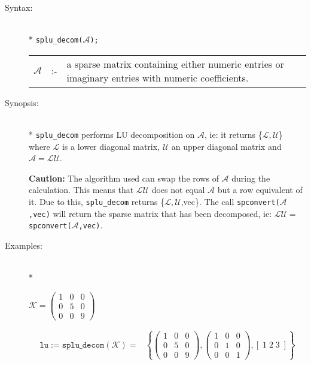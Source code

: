 \begin{description}
\item[Syntax:]\mbox{}\\*
\texttt{splu\_decom($\mathcal{A}$);}\\[2mm]
\begin{tabular}{l l p{.848\linewidth}}
$\mathcal{A}$ &:-& a sparse matrix containing either 
numeric entries or imaginary entries with numeric coefficients.
\end{tabular}

\item[Synopsis:]\mbox{}\\*
              \texttt{splu\_decom} performs LU decomposition on $\mathcal{A}$,
              ie: it returns \{$\mathcal{L,U}$\} where $\mathcal{L}$
              is a lower diagonal matrix, $\mathcal{U}$ an upper diagonal
              matrix and $\mathcal{A} = \mathcal{LU}$.

\textbf{Caution:}
The algorithm used can swap the rows of $\mathcal{A}$ 
                during the calculation. This means that $\mathcal{LU}$ does
                not equal $\mathcal{A}$ but a row equivalent of it. Due to
                this, \texttt{splu\_decom} returns \{$\mathcal{L,U}$,vec\}. The
                call \texttt{spconvert($\mathcal{A}$,vec)} will return the 
                sparse matrix that has been decomposed, ie: $\mathcal{LU} = $
                \texttt{spconvert($\mathcal{A}$,vec)}.

\item[Examples:]\mbox{}\\*
\begin{flushleft}
\begin{math}  
\mathcal{K} = \begin{pmatrix} 1 & 0 & 0 \\ 0 & 5 & 0 \\ 0 & 0 & 9 \end{pmatrix}
\end{math}  
\end{flushleft}

\begin{align*}  
\texttt{lu} := \texttt{splu\_decom}(\mathcal{K}) = & 
\left\{ 
        \begin{pmatrix} 1 & 0 & 0 \\ 0 & 5 & 0 \\ 0 & 0 & 9 \end{pmatrix}, 
        \begin{pmatrix} 1 & 0 & 0 \\ 0 & 1 & 0 \\ 0 & 0 & 1 \end{pmatrix}, 
	[\; 1 \; 2 \; 3 \; ]
\right\} 
\end{align*}


\end{description}
